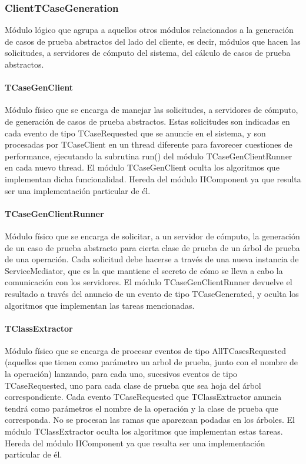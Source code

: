 \documentclass[a4paper,10pt]{report}
\begin{document}
			\subsubsection{ClientTCaseGeneration}
			Módulo lógico que agrupa a aquellos otros módulos relacionados a la generación de casos de prueba abstractos del lado del cliente, es decir, módulos que hacen las solicitudes, a  servidores de cómputo del sistema, del cálculo de casos de prueba abstractos.
				\paragraph{TCaseGenClient}
				Módulo físico que se encarga de manejar las solicitudes, a servidores de cómputo, de generación de casos de prueba abstractos. Estas solicitudes son indicadas en cada evento de tipo TCaseRequested que se anuncie en el sistema, y son procesadas por TCaseClient en un thread diferente para favorecer cuestiones de performance, ejecutando la subrutina run() del módulo TCaseGenClientRunner en cada nuevo thread. El módulo TCaseGenClient oculta los algoritmos que implementan dicha funcionalidad. Hereda del módulo IIComponent ya que resulta ser una implementación particular de él.
				\paragraph{TCaseGenClientRunner}
				Módulo físico que se encarga de solicitar, a un servidor de cómputo, la generación de un caso de prueba abstracto para cierta clase de prueba de un árbol de prueba de una operación. Cada solicitud debe hacerse a través de una nueva instancia de ServiceMediator, que es la que mantiene el secreto de cómo se lleva a cabo la comunicación con los servidores. El módulo TCaseGenClientRunner devuelve el resultado a través del anuncio de un evento de tipo TCaseGenerated, y oculta los algoritmos que implementan las tareas mencionadas.
				\paragraph{TClassExtractor}
				Módulo físico que se encarga de procesar eventos de tipo AllTCasesRequested (aquellos que tienen como parámetro un arbol de prueba, junto con el nombre de la operación) lanzando, para cada uno, sucesivos eventos de tipo TCaseRequested, uno para cada clase de prueba que sea hoja del árbol correspondiente. Cada evento TCaseRequested que TClassExtractor anuncia tendrá como parámetros el nombre de la operación y la clase de prueba que corresponda. No se procesan las ramas que aparezcan podadas en los árboles. El módulo TClassExtractor oculta los algoritmos que implementan estas tareas. Hereda del módulo IIComponent ya que resulta ser una implementación particular de él.
\end{document}
